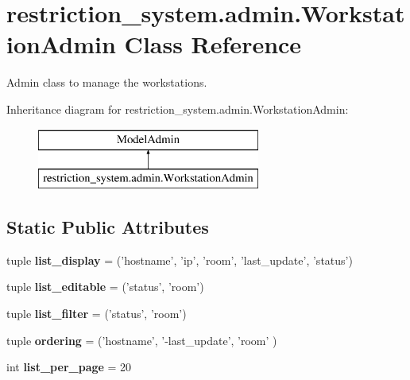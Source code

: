 \hypertarget{classrestriction__system_1_1admin_1_1WorkstationAdmin}{}\section{restriction\+\_\+system.\+admin.\+Workstation\+Admin Class Reference}
\label{classrestriction__system_1_1admin_1_1WorkstationAdmin}


Admin class to manage the workstations.  


Inheritance diagram for restriction\+\_\+system.\+admin.\+Workstation\+Admin\+:\begin{figure}[H]
\begin{center}
\leavevmode
\includegraphics[height=2.000000cm]{classrestriction__system_1_1admin_1_1WorkstationAdmin}
\end{center}
\end{figure}
\subsection*{Static Public Attributes}
\begin{DoxyCompactItemize}
\item 
\hypertarget{classrestriction__system_1_1admin_1_1WorkstationAdmin_a0923d8d507130529fc0fad770dbbe08a}{}tuple {\bfseries list\+\_\+display} = ('hostname', 'ip', 'room', 'last\+\_\+update', 'status')\label{classrestriction__system_1_1admin_1_1WorkstationAdmin_a0923d8d507130529fc0fad770dbbe08a}

\item 
\hypertarget{classrestriction__system_1_1admin_1_1WorkstationAdmin_a5f2412a6e37bf2124277ff4974adee08}{}tuple {\bfseries list\+\_\+editable} = ('status', 'room')\label{classrestriction__system_1_1admin_1_1WorkstationAdmin_a5f2412a6e37bf2124277ff4974adee08}

\item 
\hypertarget{classrestriction__system_1_1admin_1_1WorkstationAdmin_a3d6bf322e8162b5f887aedb20b2d498d}{}tuple {\bfseries list\+\_\+filter} = ('status', 'room')\label{classrestriction__system_1_1admin_1_1WorkstationAdmin_a3d6bf322e8162b5f887aedb20b2d498d}

\item 
\hypertarget{classrestriction__system_1_1admin_1_1WorkstationAdmin_ab988e8355b08638a143bf0326481d559}{}tuple {\bfseries ordering} = ('hostname', '-\/last\+\_\+update', 'room' )\label{classrestriction__system_1_1admin_1_1WorkstationAdmin_ab988e8355b08638a143bf0326481d559}

\item 
\hypertarget{classrestriction__system_1_1admin_1_1WorkstationAdmin_a1d44b210ffa175d6e937b2dcee5b5420}{}int {\bfseries list\+\_\+per\+\_\+page} = 20\label{classrestriction__system_1_1admin_1_1WorkstationAdmin_a1d44b210ffa175d6e937b2dcee5b5420}

\end{DoxyCompactItemize}


